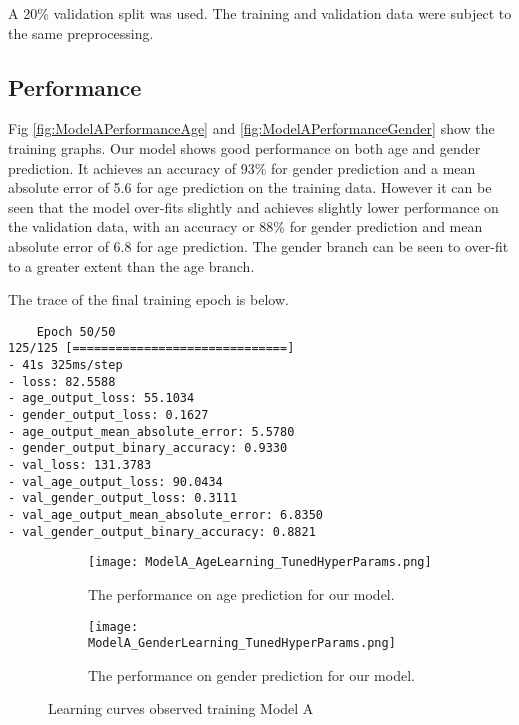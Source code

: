 A 20\% validation split was used. The training and validation data were subject to the same preprocessing.

\subsection{Performance}
Fig \autoref{fig:ModelAPerformanceAge} and \autoref{fig:ModelAPerformanceGender} show the training graphs. 
Our model shows good performance on both age and gender prediction. 
It achieves an accuracy of 93\% for gender prediction and a mean absolute error of 5.6 for age prediction on the training data. 
However it can be seen that the model over-fits slightly and achieves slightly lower performance on the validation data, with an accuracy or 88\% for gender prediction and mean absolute error of 6.8 for age prediction. 
The gender branch can be seen to over-fit to a greater extent than the age branch.

The trace of the final training epoch is below.\\
\begin{verbatim}
    Epoch 50/50
125/125 [==============================] 
- 41s 325ms/step 
- loss: 82.5588 
- age_output_loss: 55.1034 
- gender_output_loss: 0.1627 
- age_output_mean_absolute_error: 5.5780 
- gender_output_binary_accuracy: 0.9330 
- val_loss: 131.3783 
- val_age_output_loss: 90.0434 
- val_gender_output_loss: 0.3111 
- val_age_output_mean_absolute_error: 6.8350 
- val_gender_output_binary_accuracy: 0.8821
\end{verbatim}

\begin{figure}[h]
    \centering
    \begin{subfigure}{\textwidth}
        \texttt{[image: ModelA\_AgeLearning\_TunedHyperParams.png]}
        \caption{\label{fig:ModelAPerformanceAge} The performance on age prediction for our model.}
    \end{subfigure}
    \begin{subfigure}{\textwidth}
        \texttt{[image: ModelA\_GenderLearning\_TunedHyperParams.png]}
        \caption{\label{fig:ModelAPerformanceGender} The performance on gender prediction for our model.}
    \end{subfigure}
    \label{fig:ModelAPerformance}
    \caption{Learning curves observed training Model A}
\end{figure}
